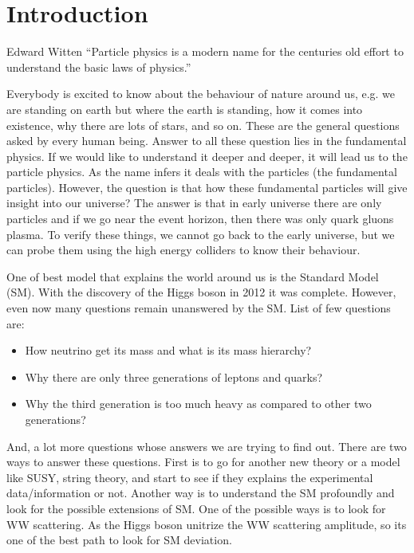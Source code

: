 \chapter{Introduction}

\begin{chapquote}
{Edward Witten}
``Particle physics is a modern name for the centuries old effort to understand the basic laws of physics.''
\end{chapquote}

Everybody is excited to know about the behaviour of nature around us, e.g. we are standing on earth but where the earth is standing, how it comes into existence, why there are lots of stars, and so on. These are the general questions asked by every human being. Answer to all these question lies in the fundamental physics. If we would like to understand it deeper and deeper, it will lead us to the particle physics. As the name infers it deals with the particles (the fundamental particles). However, the question is that how these fundamental particles will give insight into our universe? The answer is that in early universe there are only particles and if we go near the event horizon, then there was only quark gluons plasma. To verify these things, we cannot go back to the early universe, but we can probe them using the high energy colliders to know their behaviour.

One of best model that explains the world around us is the Standard Model (SM). With the discovery of the Higgs boson \cite{Chatrchyan:2012xdj} in 2012 it was complete. However, even now many questions remain unanswered by the SM. List of few questions are:

\begin{itemize}
\item How neutrino get its mass and what is its mass hierarchy? 
\item Why there are only three generations of leptons and quarks? 
\item Why the third generation is too much heavy as compared to other two generations?
\end{itemize}

And, a lot more questions whose answers we are trying to find out. There are two ways to answer these questions. First is to go for another new theory or a model like SUSY, string theory, and start to see if they explains the experimental data/information or not. Another way is to understand the SM profoundly and look for the possible extensions of SM. One of the possible ways is to look for WW scattering. As the Higgs boson unitrize the WW scattering amplitude, so its one of the best path to look for SM deviation.

